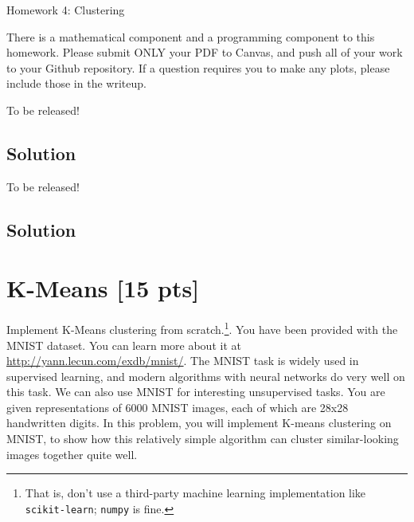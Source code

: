 \documentclass[submit]{harvardml}
\begin{document}
\begin{center}
{\Large Homework 4: Clustering}\\
\end{center}

There is a mathematical component and a programming component to this homework.
Please submit ONLY your PDF to Canvas, and push all of your work to your Github
repository. If a question requires you to make any plots, please
include those in the writeup.


\begin{problem}
To be released!
\end{problem}
\subsection*{Solution}



\newpage
\begin{problem}
To be released!
\end{problem}
\subsection*{Solution}

\newpage
\section*{K-Means [15 pts]}
Implement K-Means clustering from scratch.\footnote{That is, don't use a third-party machine learning implementation like \texttt{scikit-learn}; \texttt{numpy} is fine.}. You have been provided with the MNIST dataset. You can learn more about it at  \url{http://yann.lecun.com/exdb/mnist/}. The MNIST task is widely used in supervised learning, and modern algorithms with neural networks do very well on this task. We can also use MNIST for interesting unsupervised tasks. You are given representations of 6000 MNIST images, each of which are 28x28  handwritten digits. In this problem, you will implement K-means clustering on MNIST, to show how this relatively simple algorithm can cluster similar-looking images together quite well.
\end{document}
